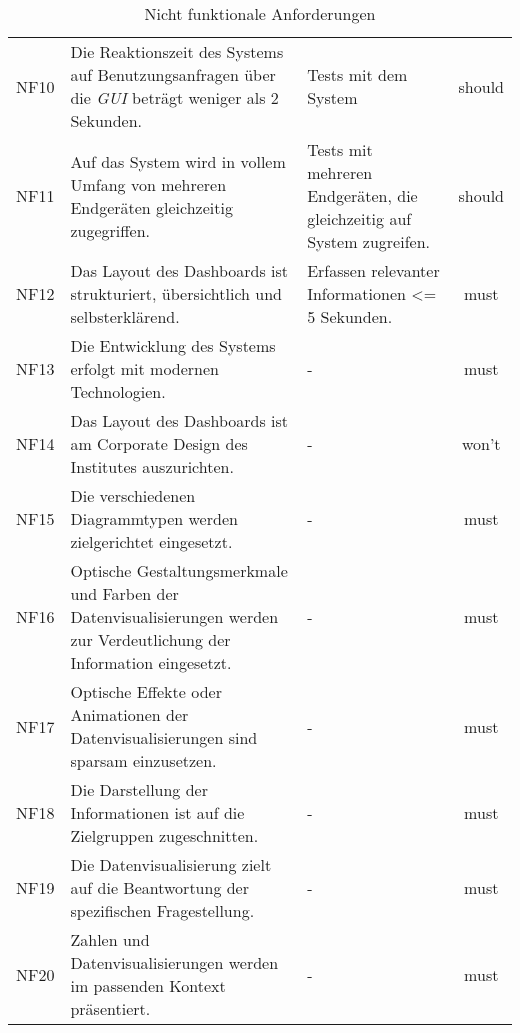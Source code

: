 \begin{table}[H]
\begin{adjustbox}{max width=\textwidth}
\begin{tabular}{lp{7.0cm}p{7.0cm}c}
        NF10                              &Die Reaktionszeit des Systems auf Benutzungsanfragen über die \textit{\acrshort{GUI}} beträgt weniger als 2 Sekunden. & Tests mit dem System& should\\
        NF11                              &Auf das System wird in vollem Umfang von mehreren Endgeräten gleichzeitig zugegriffen. & Tests mit mehreren Endgeräten, die gleichzeitig auf System zugreifen.& should\\
        NF12                              &Das Layout des Dashboards ist strukturiert, übersichtlich und selbsterklärend. & Erfassen relevanter Informationen <= 5 Sekunden.& must\\
        NF13                              &Die Entwicklung des Systems erfolgt mit modernen Technologien. & - & must\\
        NF14                              &Das Layout des Dashboards ist am Corporate Design des Institutes auszurichten. & -& won't\\
        NF15                              &Die verschiedenen Diagrammtypen werden zielgerichtet eingesetzt. & -& must\\
        NF16                              &Optische Gestaltungsmerkmale und Farben der Datenvisualisierungen werden zur Verdeutlichung der Information eingesetzt. &- & must\\
        NF17                              &Optische Effekte oder Animationen der Datenvisualisierungen sind sparsam einzusetzen. & -& must\\
        NF18                              &Die Darstellung der Informationen ist auf die Zielgruppen zugeschnitten. & -& must\\
        NF19                              &Die Datenvisualisierung zielt auf die Beantwortung der spezifischen Fragestellung. & -& must\\
        NF20                              &Zahlen und Datenvisualisierungen werden im passenden Kontext präsentiert. & -& must\\
       \bottomrule
    \end{tabular}
    \end{adjustbox}
    \caption{%
        Nicht funktionale Anforderungen
    }
    \label{tab: nfAnforderungen}
    \end{table}
\endgroup
